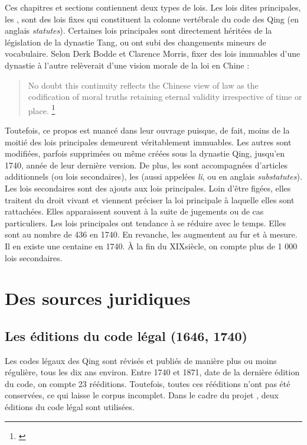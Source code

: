 Ces chapitres et sections contiennent deux types de lois. Les lois dites principales, les \lu, sont des lois fixes qui constituent la colonne vertébrale du code des Qing (en anglais \textit{statutes}). Certaines lois principales sont directement héritées de la législation de la dynastie Tang, ou ont subi des changements mineurs de vocabulaire. Selon Derk Bodde et Clarence Morris, fixer des lois immuables d'une dynastie à l'autre relèverait d'une vision morale de la loi en Chine : 
\begin{quote}
    No doubt this continuity reflects the Chinese view of law as the codification of moral truths retaining eternal validity irrespective of time or place. \footnote{\cite{law_in_imperial_china}}
\end{quote}

Toutefois, ce propos est nuancé dans leur ouvrage puisque, de fait, moins de la moitié des lois principales demeurent véritablement immuables. Les autres \lu sont modifiées, parfois supprimées ou même créées sous la dynastie Qing, jusqu'en 1740, année de leur dernière version. De plus, les \lu sont accompagnées d'articles additionnels (ou lois secondaires), les \li (aussi appelées \textit{li}, ou en anglais \textit{substatutes}). Les lois secondaires sont des ajouts aux lois principales. Loin d'être figées, elles traitent du droit vivant et viennent préciser la loi principale à laquelle elles sont rattachées. Elles apparaissent souvent à la suite de jugements ou de cas particuliers. Les lois principales ont tendance à se réduire avec le temps. Elles sont au nombre de 436 en 1740. En revanche, les \li augmentent au fur et à mesure. Il en existe une centaine en 1740. À la fin du XIX\ieme siècle, on compte plus de 1 000 lois secondaires. 

 \section{Des sources juridiques}
    \subsection{Les éditions du code légal (1646, 1740)}

Les codes légaux des Qing sont révisés et publiés de manière plus ou moins régulière, tous les dix ans environ. Entre 1740 et 1871, date de la dernière édition du code, on compte 23 rééditions. Toutefois, toutes ces rééditions n'ont pas été conservées, ce qui laisse le corpus incomplet. Dans le cadre du projet \COREL, deux éditions du code légal sont utilisées. 

